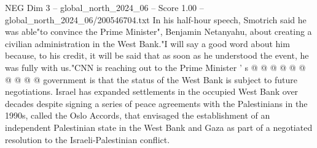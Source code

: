 \begin{textsample}{NEG Dim 3 – global\_north\_2024\_06 – Score 1.00 – global\_north\_2024\_06/200546704.txt}
In his half-hour speech, Smotrich said he was able"to convince the Prime Minister", Benjamin Netanyahu, about creating a civilian administration in the West Bank."I will say a good word about him because, to his credit, it will be said that as soon as he understood the event, he was fully with us."CNN is reaching out to the Prime Minister ' s @ @ @ @ @ @ @ @ @ @ government is that the status of the West Bank is subject to future negotiations.
Israel has expanded settlements in the occupied West Bank over decades despite signing a series of peace agreements with the Palestinians in the 1990s, called the Oslo Accords, that envisaged the establishment of an independent Palestinian state in the West Bank and Gaza as part of a negotiated resolution to the Israeli-Palestinian conflict.

\end{textsample}
